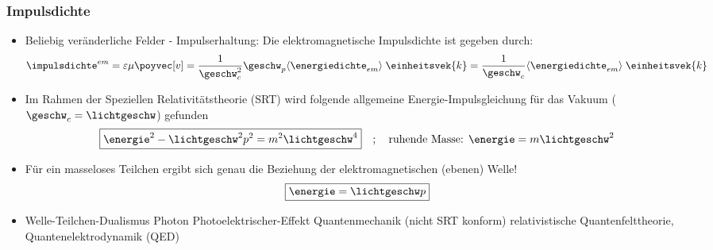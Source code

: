 \begin{frame}
  \frametitle{Impulsdichte}
  \begin{itemize}[<+->]      
  \item Beliebig veränderliche Felder - Impulserhaltung: Die elektromagnetische Impulsdichte ist gegeben durch:
    \begin{equation*}
      \impulsdichte^{em} = \varepsilon\mu\poyvec[v] = \frac{1}{\geschw_c^2} \geschw_p \langle \energiedichte_{em}\rangle\; \einheitsvek{k} = \frac{1}{\geschw_c} \langle \energiedichte_{em}\rangle\; \einheitsvek{k}
      \end{equation*}
  \item Im Rahmen der \alert{Speziellen Relativitätstheorie} (SRT) wird folgende \alert{allgemeine Energie-Impulsgleichung} für das Vakuum (\(\geschw_c = \lichtgeschw \)) gefunden
    \begin{equation*}
      \boxed{\energie^2 - \lichtgeschw^2p^2 = m^2\lichtgeschw^4}\quad; \quad \text{ruhende Masse: } \energie = m\lichtgeschw^2   
    \end{equation*}
  \item Für ein \alert{masseloses Teilchen} ergibt sich genau die Beziehung der elektromagnetischen (ebenen) Welle!
    \begin{equation*}
      \boxed{\energie =   \lichtgeschw p }   
    \end{equation*}
    \item \ergo \alert{Welle-Teilchen-Dualismus} \ergo \alert{Photon} \ergo \alert{Photoelektrischer-Effekt} \ergo \alert{Quantenmechanik} (nicht SRT konform) \ergo \alert{relativistische Quantenfelttheorie, Quantenelektrodynamik (QED)}
    \end{itemize}
    
  \end{frame}
  

   
